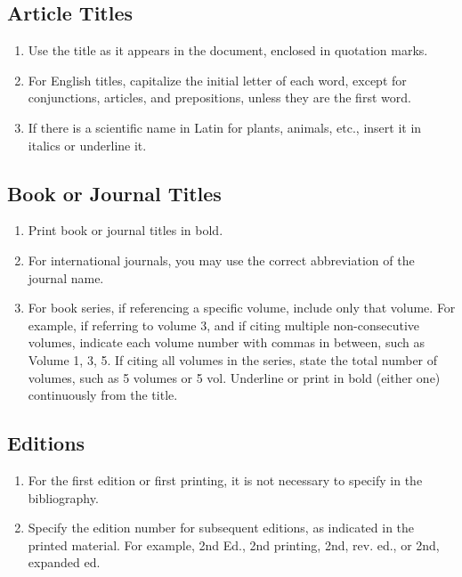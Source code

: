 \subsection{Article Titles}

\begin{enumerate}
    \item Use the title as it appears in the document, enclosed in quotation marks.
    \item For English titles, capitalize the initial letter of each word, except for conjunctions, articles, and prepositions, unless they are the first word.
    \item If there is a scientific name in Latin for plants, animals, etc., insert it in italics or underline it.
\end{enumerate}

\subsection{Book or Journal Titles}

\begin{enumerate}
    \item Print book or journal titles in bold.
    \item For international journals, you may use the correct abbreviation of the journal name.
    \item For book series, if referencing a specific volume, include only that volume. For example, if referring to volume 3, and if citing multiple non-consecutive volumes, indicate each volume number with commas in between, such as Volume 1, 3, 5. If citing all volumes in the series, state the total number of volumes, such as 5 volumes or 5 vol. Underline or print in bold (either one) continuously from the title.
\end{enumerate}

\subsection{Editions}

\begin{enumerate}
    \item For the first edition or first printing, it is not necessary to specify in the bibliography.
    \item Specify the edition number for subsequent editions, as indicated in the printed material. For example, 2nd Ed., 2nd printing, 2nd, rev. ed., or 2nd, expanded ed.
\end{enumerate}

